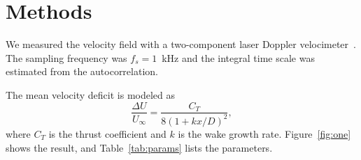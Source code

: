 \section{Methods}
\label{sec:methods}

We measured the velocity field with a two-component laser Doppler
velocimeter~\citep{lee2018}.
The sampling frequency was $f_s = 1$~kHz and the
integral time scale was estimated from the autocorrelation.

The mean velocity deficit is modeled as
\begin{equation}
  \frac{\Delta U}{U_\infty} = \frac{C_T}{8 (1 + k x/D)^2},
  \label{eq:wake}
\end{equation}
where $C_T$ is the thrust coefficient and $k$ is the wake growth rate.
Figure~\ref{fig:one} shows the result, and Table~\ref{tab:params} lists
the parameters.
